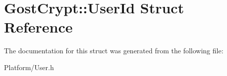 \hypertarget{struct_gost_crypt_1_1_user_id}{}\section{Gost\+Crypt\+:\+:User\+Id Struct Reference}
\label{struct_gost_crypt_1_1_user_id}


The documentation for this struct was generated from the following file\+:\begin{DoxyCompactItemize}
\item 
Platform/User.\+h\end{DoxyCompactItemize}
